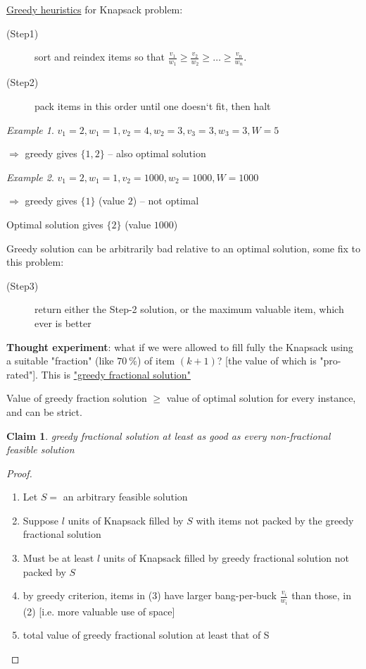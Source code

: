 \documentclass[a4paper,12pt]{article}
\theoremstyle{plain}
\newtheorem{claim}{Claim}
\theoremstyle{definition}
\theoremstyle{remark}
\newtheorem*{example}{Example}
\begin{document}
\underline{Greedy heuristics} for Knapsack problem:
\begin{description}
	\item[(Step1)] sort and reindex items so that $\frac{v_1}{w_1} \geq \frac{v_2}{w_2} \geq \dots \geq \frac{v_n}{w_n}$.
	\item[(Step2)] pack items in this order until one doesn`t fit, then halt
\end{description}

\begin{example}$v_1 = 2, w_1 = 1, v_2 = 4, w_2 = 3, v_3 = 3, w_3 = 3, W = 5$

$\Rightarrow$ greedy gives $\{1, 2\}$ -- also optimal solution
\end{example}

\begin{example}$v_1 = 2, w_1 = 1, v_2 = 1000, w_2 = 1000, W = 1000$

$\Rightarrow$ greedy gives $\{1\}$ (value $2$) -- not optimal

Optimal solution gives $\{2\}$ (value $1000$)
\end{example}

Greedy solution can be arbitrarily bad relative to an optimal solution, some fix to this problem:
\begin{description}
	\item[(Step3)] return either the Step-2 solution, or the maximum valuable item, which ever is better
\end{description}

\textbf{Thought experiment}: what if we were allowed to fill fully the Knapsack using a suitable "fraction" (like $70~\%$) of item $(k+1)$? [the value of which is "pro-rated"]. This is \underline{"greedy fractional solution"}

Value of greedy fraction solution $\geq$ value of optimal solution for every instance, and can be strict.

\begin{claim}
greedy fractional solution at least as good as every non-fractional feasible solution
\end{claim}

\begin{proof}
\begin{enumerate}
	\item Let $S =$ an arbitrary feasible solution
	\item Suppose $l$ units of Knapsack filled by $S$ with items not packed by the greedy fractional solution
	\item Must be at least $l$ units of Knapsack filled by greedy fractional solution not packed by $S$
	\item by greedy criterion, items in (3) have larger bang-per-buck $\frac{v_i}{w_i}$ than those, in (2) [i.e. more valuable use of space]
	\item total value of greedy fractional solution at least that of S
\end{enumerate}
\end{proof}
\end{document}
